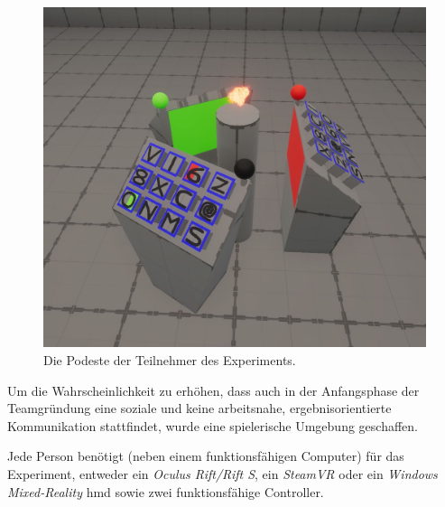 \documentclass[a4paper,11pt]{article}%
\renewcommand{\\}{\vspace*{0.5\baselineskip} \newline}
\begin{document}
\begin{figure}[h]
		\begin{footnotesize}
			\includegraphics[width=\textwidth]{Abbildungen/Podeste.JPG}	
			\caption[Die Podeste der Teilnehmer]{Die Podeste der Teilnehmer des Experiments.}
			\label{Podeste}
		\end{footnotesize}
	\end{figure}

Um die Wahrscheinlichkeit zu erhöhen, dass auch in der Anfangsphase der Teamgründung eine soziale und keine arbeitsnahe, ergebnisorientierte Kommunikation stattfindet, wurde eine spielerische Umgebung geschaffen.

Jede Person benötigt (neben einem funktionsfähigen Computer) für das Experiment, entweder ein \textit{Oculus Rift/Rift S}, ein \textit{SteamVR} oder ein \textit{Windows Mixed-Reality} \ac{hmd} sowie zwei funktionsfähige Controller.
\end{document}
